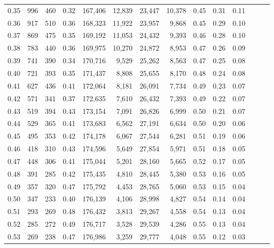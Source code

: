 \begin{tabular}{rrrrrrrrrrrrrr}
0.35 &     996 &  460 &  0.32 &  167,406 &   12,839 &  23,447 &  10,378 &  0.45 &  0.31 &      0.11 \\
0.36 &     917 &  510 &  0.36 &  168,323 &   11,922 &  23,957 &   9,868 &  0.45 &  0.29 &      0.10 \\
0.37 &     869 &  475 &  0.35 &  169,192 &   11,053 &  24,432 &   9,393 &  0.46 &  0.28 &      0.10 \\
0.38 &     783 &  440 &  0.36 &  169,975 &   10,270 &  24,872 &   8,953 &  0.47 &  0.26 &      0.09 \\
0.39 &     741 &  390 &  0.34 &  170,716 &    9,529 &  25,262 &   8,563 &  0.47 &  0.25 &      0.08 \\
0.40 &     721 &  393 &  0.35 &  171,437 &    8,808 &  25,655 &   8,170 &  0.48 &  0.24 &      0.08 \\
0.41 &     627 &  436 &  0.41 &  172,064 &    8,181 &  26,091 &   7,734 &  0.49 &  0.23 &      0.07 \\
0.42 &     571 &  341 &  0.37 &  172,635 &    7,610 &  26,432 &   7,393 &  0.49 &  0.22 &      0.07 \\
0.43 &     519 &  394 &  0.43 &  173,154 &    7,091 &  26,826 &   6,999 &  0.50 &  0.21 &      0.07 \\
0.44 &     529 &  365 &  0.41 &  173,683 &    6,562 &  27,191 &   6,634 &  0.50 &  0.20 &      0.06 \\
0.45 &     495 &  353 &  0.42 &  174,178 &    6,067 &  27,544 &   6,281 &  0.51 &  0.19 &      0.06 \\
0.46 &     418 &  310 &  0.43 &  174,596 &    5,649 &  27,854 &   5,971 &  0.51 &  0.18 &      0.05 \\
0.47 &     448 &  306 &  0.41 &  175,044 &    5,201 &  28,160 &   5,665 &  0.52 &  0.17 &      0.05 \\
0.48 &     391 &  285 &  0.42 &  175,435 &    4,810 &  28,445 &   5,380 &  0.53 &  0.16 &      0.05 \\
0.49 &     357 &  320 &  0.47 &  175,792 &    4,453 &  28,765 &   5,060 &  0.53 &  0.15 &      0.04 \\
0.50 &     347 &  233 &  0.40 &  176,139 &    4,106 &  28,998 &   4,827 &  0.54 &  0.14 &      0.04 \\
0.51 &     293 &  269 &  0.48 &  176,432 &    3,813 &  29,267 &   4,558 &  0.54 &  0.13 &      0.04 \\
0.52 &     285 &  272 &  0.49 &  176,717 &    3,528 &  29,539 &   4,286 &  0.55 &  0.13 &      0.04 \\
0.53 &     269 &  238 &  0.47 &  176,986 &    3,259 &  29,777 &   4,048 &  0.55 &  0.12 &      0.03 \\

\end{tabular}
